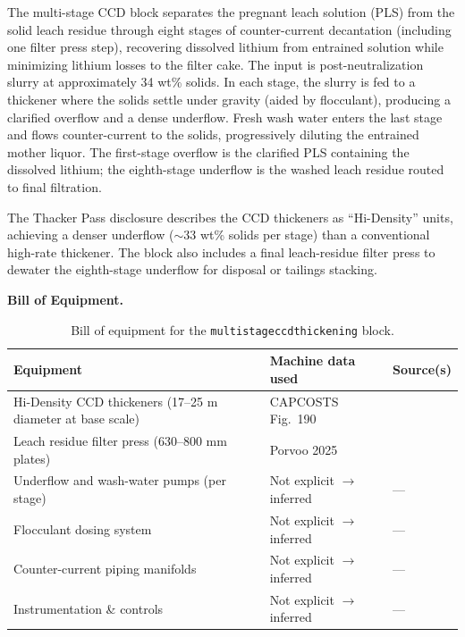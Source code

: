 \documentclass{article}
\renewcommand\_{\textunderscore\allowbreak}
\begin{document}
The multi-stage CCD block separates the pregnant leach solution (PLS) from the solid leach residue through eight stages of counter-current decantation (including one filter press step), recovering dissolved lithium from entrained solution while minimizing lithium losses to the filter cake. The input is post-neutralization slurry at approximately 34 wt\% solids. In each stage, the slurry is fed to a thickener where the solids settle under gravity (aided by flocculant), producing a clarified overflow and a dense underflow. Fresh wash water enters the last stage and flows counter-current to the solids, progressively diluting the entrained mother liquor. The first-stage overflow is the clarified PLS containing the dissolved lithium; the eighth-stage underflow is the washed leach residue routed to final filtration.

The Thacker Pass disclosure describes the CCD thickeners as ``Hi-Density'' units, achieving a denser underflow ($\sim$33 wt\% solids per stage) than a conventional high-rate thickener. The block also includes a final leach-residue filter press to dewater the eighth-stage underflow for disposal or tailings stacking.

\medskip
\noindent\textbf{Bill of Equipment.}\quad

\begin{table}[h!]
\caption{Bill of equipment for the \texttt{multi\_stage\_ccd\_thickening} block.}
\centering
\begin{tabular}{>{\raggedright\arraybackslash}p{5.2cm}
				>{\raggedright\arraybackslash}p{4cm}
				>{\raggedright\arraybackslash}p{4.5cm}}
\toprule
\textbf{Equipment} & \textbf{Machine data used} & \textbf{Source(s)} \\
\midrule
8 Hi-Density CCD thickeners (17--25 m diameter at base scale) & CAPCOSTS Fig.~190 & \citet{mularCAPCOSTSHandbookEstimating1998} \\
Leach residue filter press (630--800 mm plates) & Porvoo 2025 & \citet{porvooIndustrialFilterPress2025} \\
Underflow and wash-water pumps (per stage) & Not explicit $\rightarrow$ inferred & --- \\
Flocculant dosing system & Not explicit $\rightarrow$ inferred & --- \\
Counter-current piping manifolds & Not explicit $\rightarrow$ inferred & --- \\
Instrumentation \& controls & Not explicit $\rightarrow$ inferred & --- \\
\bottomrule
\end{tabular}
\end{table}
\end{document}

